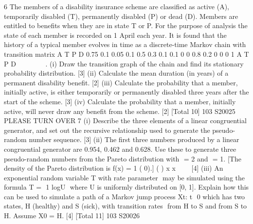 6 The members of a disability insurance scheme are classified as active (A),
temporarily disabled (T), permanently disabled (P) or dead (D). Members are
entitled to benefits when they are in state T or P. For the purpose of analysis the state
of each member is recorded on 1 April each year. It is found that the history of a
typical member evolves in time as a discrete-time Markov chain with transition matrix
A
T
P
D
0.75 0.1 0.05 0.1
0.5 0.3 0.1 0.1
0 0 0.8 0.2
0 0 0 1
A T P D
 
 
 
 
 
 
.
(i) Draw the transition graph of the chain and find its stationary probability
distribution. [3]
(ii) Calculate the mean duration (in years) of a permanent disability benefit. [2]
(iii) Calculate the probability that a member, initially active, is either temporarily
or permanently disabled three years after the start of the scheme. [3]
(iv) Calculate the probability that a member, initially active, will never draw any
benefit from the scheme. [2]
[Total 10]
103 S20025 PLEASE TURN OVER
7 (i) Describe the three elements of a linear congruential generator, and set out the
recursive relationship used to generate the pseudo-random number sequence.
[3]
(ii) The first three numbers produced by a linear congruential generator are 0.954,
0.462 and 0.628. Use these to generate three pseudo-random numbers from
the Pareto distribution with  = 2 and  = 1.
[The density of the Pareto distribution is f(x) = 1 ( 0).]
( )
x
x




 
[4]
(iii) An exponential random variable T with rate parameter  may be simulated
using the formula
T =  1 logU

where U is uniformly distributed on [0, 1]. Explain how this can be used to
simulate a path of a Markov jump process {Xt: t  0} which has two states,
H (healthy) and S (sick), with transition rates  from H to S and 	 from S to H.
Assume X0 = H. [4]
[Total 11]
103 S20026



